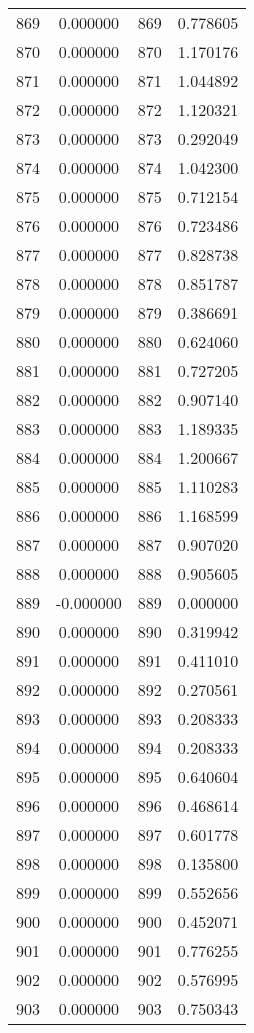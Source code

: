\documentclass[12pt]{article}
\begin{document}
\begin{longtable}{@{}cccc@{}}
869 & 0.000000 & 869 & 0.778605 \\
870 & 0.000000 & 870 & 1.170176 \\
871 & 0.000000 & 871 & 1.044892 \\
872 & 0.000000 & 872 & 1.120321 \\
873 & 0.000000 & 873 & 0.292049 \\
874 & 0.000000 & 874 & 1.042300 \\
875 & 0.000000 & 875 & 0.712154 \\
876 & 0.000000 & 876 & 0.723486 \\
877 & 0.000000 & 877 & 0.828738 \\
878 & 0.000000 & 878 & 0.851787 \\
879 & 0.000000 & 879 & 0.386691 \\
880 & 0.000000 & 880 & 0.624060 \\
881 & 0.000000 & 881 & 0.727205 \\
882 & 0.000000 & 882 & 0.907140 \\
883 & 0.000000 & 883 & 1.189335 \\
884 & 0.000000 & 884 & 1.200667 \\
885 & 0.000000 & 885 & 1.110283 \\
886 & 0.000000 & 886 & 1.168599 \\
887 & 0.000000 & 887 & 0.907020 \\
888 & 0.000000 & 888 & 0.905605 \\
889 & -0.000000 & 889 & 0.000000 \\
890 & 0.000000 & 890 & 0.319942 \\
891 & 0.000000 & 891 & 0.411010 \\
892 & 0.000000 & 892 & 0.270561 \\
893 & 0.000000 & 893 & 0.208333 \\
894 & 0.000000 & 894 & 0.208333 \\
895 & 0.000000 & 895 & 0.640604 \\
896 & 0.000000 & 896 & 0.468614 \\
897 & 0.000000 & 897 & 0.601778 \\
898 & 0.000000 & 898 & 0.135800 \\
899 & 0.000000 & 899 & 0.552656 \\
900 & 0.000000 & 900 & 0.452071 \\
901 & 0.000000 & 901 & 0.776255 \\
902 & 0.000000 & 902 & 0.576995 \\
903 & 0.000000 & 903 & 0.750343 \\

\end{longtable}
\end{document}
